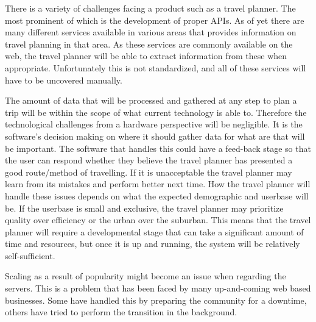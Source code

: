 There is a variety of challenges facing a product such as a travel planner. The
most prominent of which is the development of proper APIs. As of yet there are
many different services available in various areas that provides information on
travel planning in that area. As these services are commonly available on the
web, the travel planner will be able to extract information from these when
appropriate. Unfortunately this is not standardized, and all of these services 
will have to be uncovered manually.

The amount of data that will be processed and gathered at any step to plan a trip will be within the
scope of what current technology is able to. Therefore the technological
challenges from a hardware perspective will be negligible. It is the software's
decision making on where it should gather data for what are that will be
important. The software that handles this could have a feed-back stage so that
the user can respond whether they believe the travel planner has presented a
good route/method of travelling. If it is unacceptable the travel planner may learn
from its mistakes and perform better next time. How the travel planner will
handle these issues depends on what the expected demographic and userbase will
be. If the userbase is small and exclusive, the travel planner may prioritize
quality over efficiency or the urban over the suburban. This means that the
travel planner will require a developmental stage that can take a significant
amount of time and resources, but once it is up and running, the system will be
relatively self-sufficient.

Scaling as a result of popularity might become an
issue when regarding the servers. This is a problem that has been faced by many
up-and-coming web based businesses. Some have handled this by preparing the
community for a downtime, others have tried to perform the transition in the
background. 
